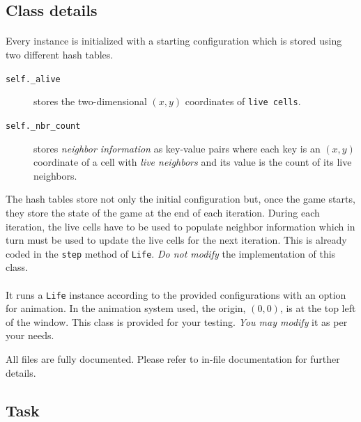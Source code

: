 \documentclass[addpoints]{exam}
\begin{document}
\subsection{Class details}

\paragraph{} Every instance is initialized with a starting configuration which is stored using two different hash tables.
\begin{description}
\item[\texttt{self.\_alive}] stores the two-dimensional $(x,y)$ coordinates of \texttt{live cells}.
\item[\texttt{self.\_nbr\_count}] stores \textit{neighbor information} as key-value pairs where each key is an $(x,y)$ coordinate of a cell with \textit{live neighbors} and its value is the count of its live neighbors.
\end{description}

The hash tables store not only the initial configuration but, once the game starts, they store the state of the game at the end of each iteration. During each iteration, the live cells have to be used to populate neighbor information which in turn must be used to update the live cells for the next iteration. This is already coded in the \texttt{step} method of \texttt{Life}. \textit{Do not modify} the implementation of this class.

\paragraph{} It runs a \texttt{Life} instance according to the provided configurations with an option for animation. In the animation system used, the origin, $(0,0)$, is at the top left of the window. This class is provided for your testing. \textit{You may modify} it as per your needs.


All files are fully documented. Please refer to in-file documentation for further details.

\subsection{Task}
\end{document}
